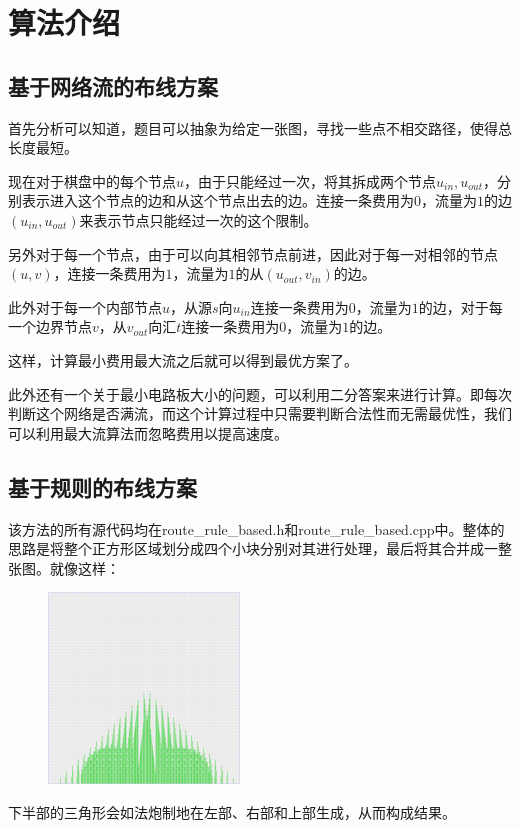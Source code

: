 \section{算法介绍} \label{algo}
\subsection{基于网络流的布线方案}
\qquad
首先分析可以知道，题目可以抽象为给定一张图，寻找一些点不相交路径，使得总长度最短。

现在对于棋盘中的每个节点$u$，由于只能经过一次，将其拆成两个节点$u_{in}, u_{out}$，分别表示进入这个节点的边和从这个节点出去的边。连接一条费用为$0$，流量为$1$的边$(u_{in}, u_{out})$来表示节点只能经过一次的这个限制。

另外对于每一个节点，由于可以向其相邻节点前进，因此对于每一对相邻的节点$(u, v)$，连接一条费用为$1$，流量为$1$的从$(u_{out}, v_{in})$的边。

此外对于每一个内部节点$u$，从源$s$向$u_{in}$连接一条费用为$0$，流量为$1$的边，对于每一个边界节点$v$，从$v_{out}$向汇$t$连接一条费用为$0$，流量为$1$的边。

这样，计算最小费用最大流之后就可以得到最优方案了。

此外还有一个关于最小电路板大小的问题，可以利用二分答案来进行计算。即每次判断这个网络是否满流，而这个计算过程中只需要判断合法性而无需最优性，我们可以利用最大流算法而忽略费用以提高速度。
\subsection{基于规则的布线方案}
\qquad
该方法的所有源代码均在route\_rule\_based.h和route\_rule\_based.cpp中。整体的思路是将整个正方形区域划分成四个小块分别对其进行处理，最后将其合并成一整张图。就像这样：

\begin{figure}[H]
	\centering
	\includegraphics[width=2in]{31.png}
\end{figure}

下半部的三角形会如法炮制地在左部、右部和上部生成，从而构成结果。

